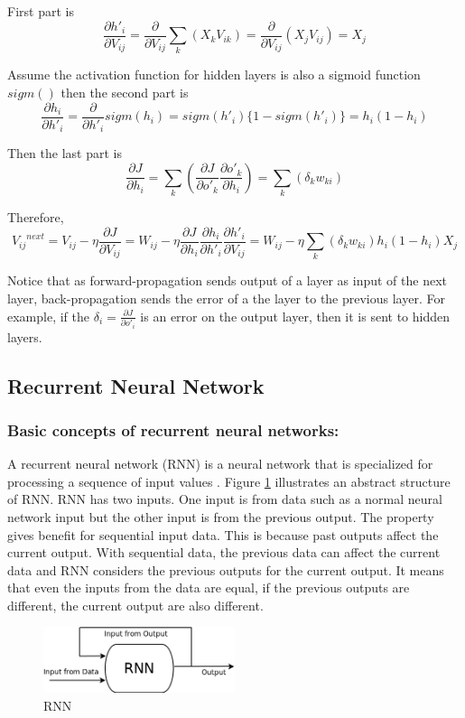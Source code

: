 \documentclass[draft,dvipsnames]{drexel-thesis}
\begin{document}
\begin{thesis}
First part is
$$
\frac{\partial h'_i}{\partial V_{ij}}
= \frac{\partial}{\partial V_{ij}}\sum_k(X_kV_{ik})
= \frac{\partial}{\partial V_{ij}}(X_jV_{ij})
= X_j
$$

Assume the activation function for hidden layers is also a sigmoid function $sigm()$ then the second part is
$$
\frac{\partial h_i}{\partial h'_i}
= \frac{\partial}{\partial h'_i}sigm(h_i)
= sigm(h'_i)\{1-sigm(h'_i)\}
= h_i(1-h_i)
$$

Then the last part is
$$
\frac{\partial J}{\partial h_i}
= \sum_k(\frac{\partial J}{\partial o'_k}\frac{\partial o'_k}{\partial h_i})
= \sum_k(\delta_kw_{ki})
$$

Therefore,
$$
{{V_{ij}}^{next}}
= V_{ij} - \eta\frac{\partial J}{\partial V_{ij}}
= W_{ij} - \eta\frac{\partial J}{\partial h_i}\frac{\partial h_i}{\partial h'_i}\frac{\partial h'_i}{\partial V_{ij}}
= W_{ij} - \eta\sum_k(\delta_kw_{ki})h_i(1-h_i)X_j
$$

Notice that as forward-propagation sends output of a layer as input of the next layer, back-propagation sends the error of a the layer to the previous layer. For example, if the $\delta_i=\frac{\partial J}{\partial o'_i}$ is an error on the output layer, then it is sent to hidden layers.




\subsection{Recurrent Neural Network}\label{subsec:RNN}

\subsubsection{Basic concepts of recurrent neural networks:}\label{basicRNN}
	A recurrent neural network (RNN) is a neural network that is specialized for processing a sequence of input values \cite{Goodfellow-et-al-2016}. Figure \ref{fig:RNN} illustrates an abstract structure of RNN. RNN has two inputs. One input is from data such as a normal neural network input but the other input is from the previous output. The property gives benefit for sequential input data. This is because past outputs affect the current output. With sequential data, the previous data can affect the current data and RNN considers the previous outputs for the current output. It means that even the inputs from the data are equal, if the previous outputs are different, the current output are also different.

\begin{figure}[t!]
    \centering
    \includegraphics[width=0.5\textwidth]{pictures/figures/RNN.png}
    \caption{RNN}
    \label{fig:RNN}
\end{figure}


\end{thesis}
\end{document}
